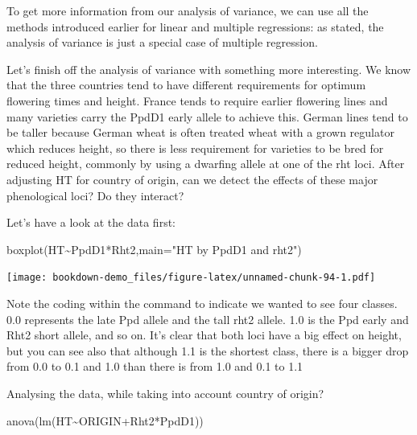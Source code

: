 \documentclass[
]{book}
\newenvironment{Shaded}{\begin{snugshade}}{\end{snugshade}}
\newcommand{\AttributeTok}[1]{\textcolor[rgb]{0.77,0.63,0.00}{#1}}
\newcommand{\FunctionTok}[1]{\textcolor[rgb]{0.00,0.00,0.00}{#1}}
\newcommand{\NormalTok}[1]{#1}
\newcommand{\SpecialCharTok}[1]{\textcolor[rgb]{0.00,0.00,0.00}{#1}}
\newcommand{\StringTok}[1]{\textcolor[rgb]{0.31,0.60,0.02}{#1}}
\begin{document}
To get more information from our analysis of variance, we can use all the methods introduced earlier for linear and multiple regressions: as stated, the analysis of variance is just a special case of multiple regression.

Let's finish off the analysis of variance with something more interesting. We know that the three countries tend to have different requirements for optimum flowering times and height. France tends to require earlier flowering lines and many varieties carry the PpdD1 early allele to achieve this. German lines tend to be taller because German wheat is often treated wheat with a grown regulator which reduces height, so there is less requirement for varieties to be bred for reduced height, commonly by using a dwarfing allele at one of the rht loci. After adjusting HT for country of origin, can we detect the effects of these major phenological loci? Do they interact?

Let's have a look at the data first:

\begin{Shaded}
\begin{Highlighting}[]
\FunctionTok{boxplot}\NormalTok{(HT}\SpecialCharTok{\textasciitilde{}}\NormalTok{PpdD1}\SpecialCharTok{*}\NormalTok{Rht2,}\AttributeTok{main=}\StringTok{"HT by PpdD1 and rht2"}\NormalTok{)}
\end{Highlighting}
\end{Shaded}

\texttt{[image: bookdown-demo\_files/figure-latex/unnamed-chunk-94-1.pdf]}

Note the coding within the command to indicate we wanted to see four classes. 0.0 represents the late Ppd allele and the tall rht2 allele. 1.0 is the Ppd early and Rht2 short allele, and so on. It's clear that both loci have a big effect on height, but you can see also that although 1.1 is the shortest class, there is a bigger drop from 0.0 to 0.1 and 1.0 than there is from 1.0 and 0.1 to 1.1

Analysing the data, while taking into account country of origin?

\begin{Shaded}
\begin{Highlighting}[]
\FunctionTok{anova}\NormalTok{(}\FunctionTok{lm}\NormalTok{(HT}\SpecialCharTok{\textasciitilde{}}\NormalTok{ORIGIN}\SpecialCharTok{+}\NormalTok{Rht2}\SpecialCharTok{*}\NormalTok{PpdD1))}
\end{Highlighting}
\end{Shaded}
\end{document}
